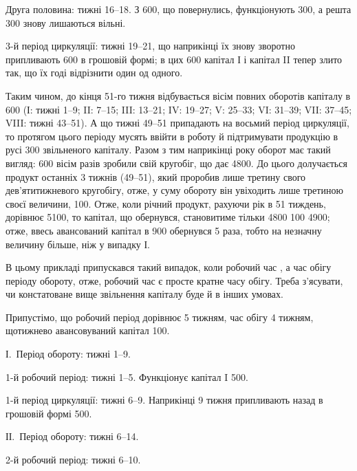 Друга половина: тижні 16--18. З 600, що повернулись,
функціонують 300, а решта 300 знову лишаються
вільні.

3-й період циркуляції: тижні 19--21, що наприкінці їх знову зворотно
припливають 600 в грошовій формі; в цих 600
капітал І і капітал II тепер злито так, що їх годі відрізнити один од одного.

Таким чином, до кінця 51-го тижня відбувається вісім повних оборотів
капіталу в 600 (І: тижні 1--9; II: 7--15; III: 13--21;
IV: 19--27; V: 25--33; VI: 31--39; VII: 37--45; VIII: тижні
43--51). А що тижні 49--51 припадають на восьмий період циркуляції,
то протягом цього періоду мусять ввійти в роботу й підтримувати
продукцію в русі 300 звільненого капіталу. Разом з тим наприкінці
року оборот має такий вигляд: 600 вісім разів зробили
свій кругобіг, що дає 4800. До цього долучається продукт
останніх 3 тижнів (49--51), який проробив лише третину свого дев’ятитижневого
кругобігу, отже, у суму обороту він увіходить лише третиною
своєї величини, 100. Отже, коли річний продукт, рахуючи рік в
51 тиждень, дорівнює 5100, то капітал, що обернувся, становитиме
тільки 4800 \dplus{} 100 \deq{} 4900; отже, ввесь авансований капітал
в 900 обернувся 5 раза, тобто на незначну величину більше,
ніж у випадку І.

В цьому прикладі припускався такий випадок, коли робочий час \deq{} ,
а час обігу \deq{}  періоду обороту, отже, робочий час є просте кратне
часу обігу. Треба з’ясувати, чи констатоване вище звільнення капіталу
буде й в інших умовах.

Припустімо, що робочий період дорівнює 5 тижням, час обігу \deq{} 4 тижням,
щотижнево авансовуваний капітал \deq{} 100.

І.~Період обороту: тижні 1--9.

1-й робочий період: тижні 1--5. Функціонує капітал I \deq{} 500.

1-й період циркуляції: тижні 6--9. Наприкінці 9 тижня припливають
назад в грошовій формі 500.

ІІ.~Період обороту: тижні 6--14.

2-й робочий період: тижні 6--10.


